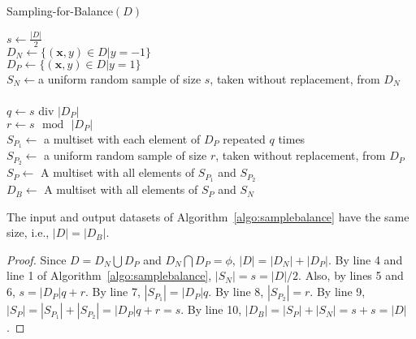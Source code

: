 \begin{algorithm}
\vspace{-2pt}
\caption{{\sf Sampling-for-Balance}$(D)$}
\label{algo:samplebalance}


$s \gets \frac{|D|}{2}$\\
$D_N \gets \{(\mathbf{x},y) \in D|y = -1\}$\\ 
$D_P \gets \{(\mathbf{x},y) \in D|y = 1\}$\\
$S_N \gets $a uniform random sample of size $s$, taken without replacement, from $D_N$\\
\\
$q \gets s$ div $|D_P|$\\
$r \gets s \,\bmod\, |D_P|$\\
$S_{P_1} \gets$ a multiset with each element of $D_P$ repeated $q$ times\\
$S_{P_2} \gets$ a uniform random sample of size $r$, taken without replacement, from $D_P$\\
$S_P \gets $ A multiset with all elements of $S_{P_1}$ and $S_{P_2}$\\
$D_B \gets $ A multiset with all elements of $S_P$ and $S_N$
\end{algorithm}

\begin{theorem}
The input and output datasets of Algorithm~\ref{algo:samplebalance} have the same size, i.e., $|D|= |D_B|$.
\end{theorem}
\begin{proof}
Since $D = D_N \bigcup D_P$ and $D_N \bigcap D_P = \phi$, $|D| = |D_N| + |D_P|$. By line 4 and line 1 of Algorithm~\ref{algo:samplebalance}, $|S_N| = s = |D|/2$. Also, by lines 5 and 6, $s = |D_P|q + r$. By line 7, $|S_{P_1}| = |D_P|q$. By line 8, $|S_{P_2}| = r$. By line 9, $|S_P| = |S_{P_1}| + |S_{P_2}| = |D_P|q + r = s$. By line 10, $|D_B| = |S_P| + |S_N| = s + s = |D|$.

\end{proof}
  
